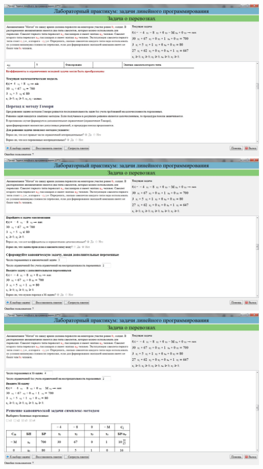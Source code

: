 \includegraphics[width=\linewidth]{om_hw_02/images/1_4.jpg}\\
\includegraphics[width=\linewidth]{om_hw_02/images/1_5.jpg}\\
\includegraphics[width=\linewidth]{om_hw_02/images/1_6.jpg}\\
